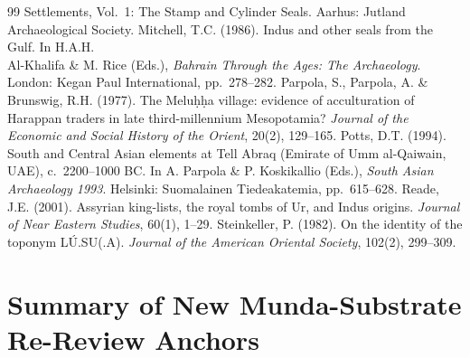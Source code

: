 \documentclass[11pt]{article}
\begin{document}
\begin{thebibliography}{99}
{  Settlements, Vol.~1: The Stamp and Cylinder Seals}. Aarhus:
  Jutland Archaeological Society.
  Mitchell, T.C. (1986). Indus and other seals from the Gulf. In
  H.A.H.\\ Al-Khalifa \& M. Rice (Eds.), \emph{Bahrain Through the
  Ages: The Archaeology}. London: Kegan Paul International, pp.~278--282.
  Parpola, S., Parpola, A. \& Brunswig, R.H. (1977). The Melu\d{h}\d{h}a
  village: evidence of acculturation of Harappan traders in late
  third-millennium Mesopotamia? \emph{Journal of the Economic and
  Social History of the Orient}, 20(2), 129--165.
  Potts, D.T. (1994). South and Central Asian elements at Tell Abraq
  (Emirate of Umm al-Qaiwain, UAE), c.~2200--1000 BC. In
  A. Parpola \& P. Koskikallio (Eds.), \emph{South Asian Archaeology
  1993}. Helsinki: Suomalainen Tiedeakatemia, pp.~615--628.
  Reade, J.E. (2001). Assyrian king-lists, the royal tombs of Ur, and
  Indus origins. \emph{Journal of Near Eastern Studies}, 60(1), 1--29.
  Steinkeller, P. (1982). On the identity of the toponym
  L\'{U}.SU(.A). \emph{Journal of the American Oriental Society},
  102(2), 299--309.
\end{thebibliography}

\appendix

\section{Summary of New Munda-Substrate Re-Review
Anchors}\label{appendix-a-summary-of-new-phase-128129-anchors}
\end{document}
